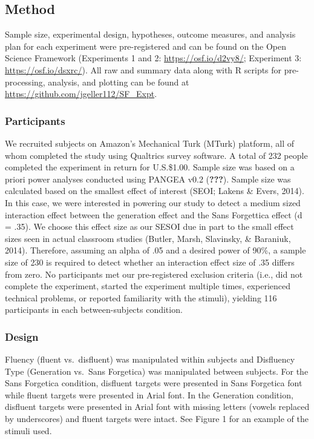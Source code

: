 \documentclass[jou]{apa6}
\begin{document}
\hypertarget{method}{%
\subsection{Method}\label{method}}

Sample size, experimental design, hypotheses, outcome measures, and analysis plan for each experiment were pre-registered and can be found on the Open Science Framework (Experiments 1 and 2: \url{https://osf.io/d2vy8/}; Experiment 3: \url{https://osf.io/dsxrc/}). All raw and summary data along with R scripts for pre-processing, analysis, and plotting can be found at \url{https://github.com/jgeller112/SF_Expt}.

\hypertarget{participants}{%
\subsubsection{Participants}\label{participants}}

We recruited subjects on Amazon's Mechanical Turk (MTurk) platform, all of whom completed the study using Qualtrics survey software. A total of 232 people completed the experiment in return for U.S.\$1.00. Sample size was based on a priori power analyses conducted using PANGEA v0.2 ({\textbf{???}}). Sample size was calculated based on the smallest effect of interest (SEOI; Lakens \& Evers, 2014). In this case, we were interested in powering our study to detect a medium sized interaction effect between the generation effect and the Sans Forgettica effect (d = .35). We choose this effect size as our SESOI due in part to the small effect sizes seen in actual classroom studies (Butler, Marsh, Slavinsky, \& Baraniuk, 2014). Therefore, assuming an alpha of .05 and a desired power of 90\%, a sample size of 230 is required to detect whether an interaction effect size of .35 differs from zero. No participants met our pre-registered exclusion criteria (i.e., did not complete the experiment, started the experiment multiple times, experienced technical problems, or reported familiarity with the stimuli), yielding 116 participants in each between-subjects condition.

\hypertarget{design}{%
\subsubsection{Design}\label{design}}

Fluency (fluent vs.~disfluent) was manipulated within subjects and Disfluency Type (Generation vs.~Sans Forgetica) was manipulated between subjects. For the Sans Forgetica condition, disfluent targets were presented in Sans Forgetica font while fluent targets were presented in Arial font. In the Generation condition, disfluent targets were presented in Arial font with missing letters (vowels replaced by underscores) and fluent targets were intact. See Figure 1 for an example of the stimuli used.
\end{document}
